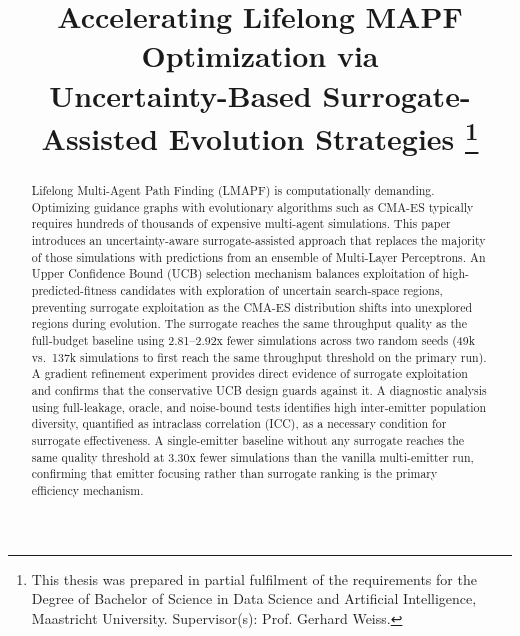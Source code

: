 \documentclass[conference]{IEEEtran}
\begin{document}

\title{Accelerating Lifelong MAPF Optimization via\\
Uncertainty-Based Surrogate-Assisted Evolution Strategies%
\thanks{This thesis was prepared in partial fulfilment of the requirements
for the Degree of Bachelor of Science in Data Science and Artificial
Intelligence, Maastricht University. Supervisor(s): Prof. Gerhard Weiss.}
}

\author{%
}

\maketitle


\begin{abstract}
Lifelong Multi-Agent Path Finding (LMAPF) is computationally demanding.
Optimizing guidance graphs with evolutionary algorithms such as CMA-ES
typically requires hundreds of thousands of expensive multi-agent
simulations. This paper introduces an uncertainty-aware surrogate-assisted
approach that replaces the majority of those simulations with predictions
from an ensemble of Multi-Layer Perceptrons. An Upper Confidence Bound
(UCB) selection mechanism balances exploitation of high-predicted-fitness
candidates with exploration of uncertain search-space regions, preventing
surrogate exploitation as the CMA-ES distribution shifts into unexplored
regions during evolution. The surrogate reaches the same throughput quality
as the full-budget baseline using 2.81--2.92x fewer simulations across two
random seeds (49k vs.\ 137k simulations to first reach the same throughput
threshold on the primary run). A gradient refinement experiment provides direct evidence of surrogate
exploitation and confirms that the conservative UCB design guards against it.
A diagnostic analysis using full-leakage, oracle, and noise-bound tests
identifies high inter-emitter population diversity, quantified as
intraclass correlation (ICC), as a necessary condition for surrogate
effectiveness. A single-emitter baseline without any surrogate reaches
the same quality threshold at 3.30x fewer simulations than the vanilla
multi-emitter run, confirming that emitter focusing rather than surrogate
ranking is the primary efficiency mechanism.
\end{abstract}
\end{document}
